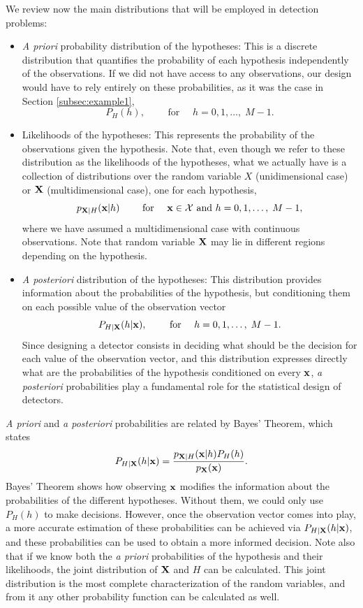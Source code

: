 We review now the main distributions that will be employed in detection problems:
\begin{itemize}
\item {\em A priori} probability distribution of the hypotheses: This is a discrete distribution that quantifies the probability of each hypothesis independently of the observations. If we did not have access to any observations, our design would have to rely entirely on these probabilities, as it was the case in Section \ref{subsec:example1},
$$P_H(h), \qquad \text{ for } \quad h = 0, 1, \ldots,\;M-1.$$
    
\item Likelihoods of the hypotheses: This represents the probability of the observations given the hypothesis. Note that, even though we refer to these distribution as the likelihoods of the hypotheses, what we actually have is a collection of distributions over the random variable $X$ (unidimensional case) or ${\bf X}$ (multidimensional case), one for each hypothesis,
$$p_{{\bf X}|H}({\bf x}|h) \qquad \text{ for } \quad {\bf x} \in {\cal X} \text{ and } h = 0, 1, \ldots,\; M-1,$$
where we have assumed a multidimensional case with continuous observations. Note that random variable $\bf X$ may lie in different regions depending on the hypothesis.
    
\item {\em A posteriori} distribution of the hypotheses: This distribution provides information about the probabilities of the hypothesis, but conditioning them on each possible value of the observation vector
$$P_{H|{\bf X}}(h|{\bf x}), \qquad \text{ for } \quad h = 0, 1, \ldots,\; M-1.$$
Since designing a detector consists in deciding what should be the decision for each value of the observation vector, and this distribution expresses directly what are the probabilities of the hypothesis conditioned on every $\bf x$, {\em a posteriori} probabilities play a fundamental role for the statistical design of detectors.     
\end{itemize}

{\em A priori} and {\em a posteriori} probabilities are related by Bayes' Theorem, which states
    $$P_{H|{\bf X}}(h|{\bf x}) = \frac{p_{{\bf  X} | H}({\bf x}|h) P_H(h)}{p_{\bf X}({\bf x})}.$$
Bayes' Theorem shows how observing $\bf x$ modifies the information about the probabilities of the different hypotheses. Without them, we could only use $P_H(h)$ to make decisions. However, once the observation vector comes into play, a more accurate estimation of these probabilities can be achieved via $P_{H|{\bf X}}(h|{\bf x})$, and these probabilities can be used to obtain a more informed decision. Note also that if we know both the {\em a priori} probabilities of the hypothesis and their likelihoods, the joint distribution of $\bf X$ and $H$ can be calculated. This joint distribution is the most complete characterization of the random variables, and from it any other probability function can be calculated as well.

